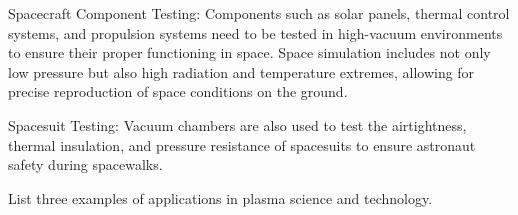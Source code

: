 \begin{itemize}
	Spacecraft Component Testing: Components such as solar panels, thermal control systems, and propulsion systems need to be tested in high-vacuum environments to ensure their proper functioning in space. Space simulation includes not only low pressure but also high radiation and temperature extremes, allowing for precise reproduction of space conditions on the ground.
	
	Spacesuit Testing: Vacuum chambers are also used to test the airtightness, thermal insulation, and pressure resistance of spacesuits to ensure astronaut safety during spacewalks.
\end{itemize}

\begin{question}
	List three examples of applications in plasma science and technology.
\end{question}

